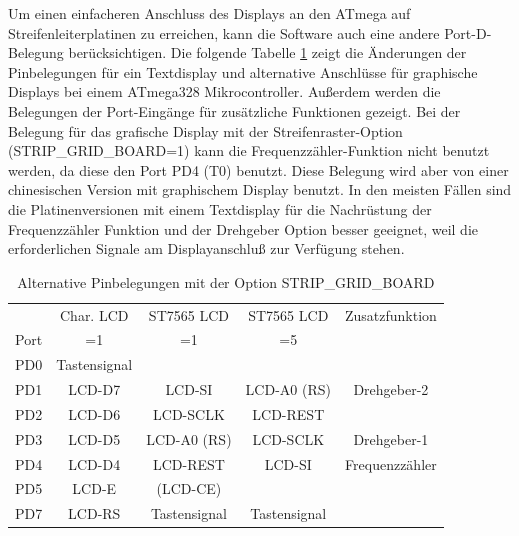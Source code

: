 Um einen einfacheren Anschluss des Displays an den ATmega auf Streifenleiterplatinen zu erreichen,
kann die Software auch eine andere Port-D-Belegung berücksichtigen.
Die folgende Tabelle \ref{tab:grid-change} zeigt die Änderungen der Pinbelegungen für ein Textdisplay und 
alternative Anschlüsse für graphische Displays bei einem ATmega328 Mikrocontroller.
Außerdem werden die Belegungen der Port-Eingänge für zusätzliche Funktionen gezeigt. 
Bei der Belegung für das grafische Display mit der Streifenraster-Option (STRIP\_GRID\_BOARD=1)
kann die Frequenzzähler-Funktion nicht benutzt werden, da diese den Port PD4 (T0) benutzt.
Diese Belegung wird aber von einer chinesischen Version mit graphischem Display benutzt.
In den meisten Fällen sind die Platinenversionen mit einem Textdisplay für die Nachrüstung der
Frequenzzähler Funktion und der Drehgeber Option besser geeignet, weil die erforderlichen
Signale am Displayanschluß zur Verfügung stehen. 


\begin{table}[H]
  \begin{center}
    \begin{tabular}{| c || c | c | c | c |}
    \hline
           & Char. LCD      & ST7565 LCD     & ST7565 LCD   & Zusatzfunktion \\
      Port &    =1          &    =1          &    =5        &  \\
    \hline
    \hline
    PD0    &  Tastensignal  &                &              &  \\
    \hline
    PD1    &  LCD-D7        & LCD-SI         &  LCD-A0 (RS) &  Drehgeber-2 \\
    \hline
    PD2    &  LCD-D6        & LCD-SCLK       &  LCD-REST    &  \\
    \hline
    PD3    &  LCD-D5        & LCD-A0 (RS)    &  LCD-SCLK    &  Drehgeber-1 \\
    \hline
    PD4    &  LCD-D4        & LCD-REST       &  LCD-SI      &  Frequenzzähler \\
    \hline
    PD5    &  LCD-E         & (LCD-CE)       &              &  \\
    \hline
    PD7    & LCD-RS         & Tastensignal   & Tastensignal &  \\
    \hline
    \end{tabular}
  \end{center}
  \caption{Alternative Pinbelegungen mit der Option STRIP\_GRID\_BOARD}
  \label{tab:grid-change}
\end{table}

